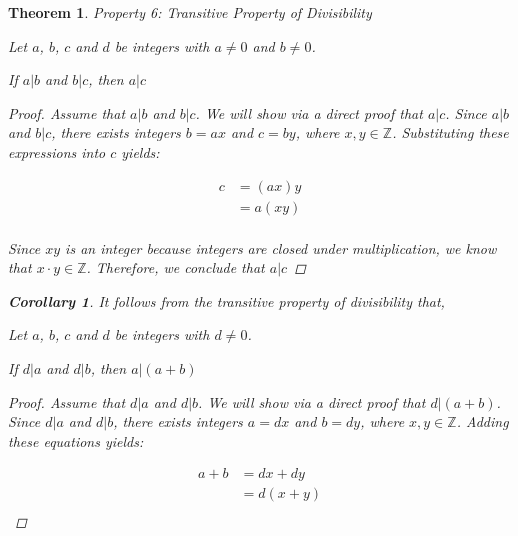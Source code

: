 \documentclass{book}
\newtheorem{theorem}{Theorem}[section]
\newtheorem{corollary}{Corollary}[theorem]
\theoremstyle{definition}
\theoremstyle{remark}
\newcommand{\bb}[1]{\mathbb{#1}}
\newcommand{\m}{\cdot}
\begin{document}
\newpage
\begin{theorem}
Property 6: Transitive Property of Divisibility \\ 
    \begin{tcolorbox}
        Let $a$, $b$, $c$ and $d$ be integers with $a \neq 0$ and $b \neq 0$. 
        \begin{center}
            If $a | b$ and $b | c$, then $a | c$
        \end{center}
    \end{tcolorbox}

    \begin{proof}
        Assume that $a | b$ and $b | c$. We will show via a direct proof that $a | c$. Since $a | b$ and $b | c$, there exists integers $b = ax$ and $c = by$, where $x, y \in \bb{Z}$. Substituting these expressions into $c$ yields:

            \begin{align*}	
            	c & = (ax)y \\
            	    & = a(xy) \\
            \end{align*}

        Since $xy$ is an integer because integers are closed under multiplication, we know that $x \m y \in \bb{Z}$. Therefore, we conclude that $a | c$ 
    \end{proof}

\bigskip
\begin{corollary}
It follows from the transitive property of divisibility that, 
    \begin{tcolorbox}
        Let $a$, $b$, $c$ and $d$ be integers with $d \neq 0$. 
        \begin{center}
            If $d | a$ and $d | b$, then $a | (a + b)$
        \end{center}
    \end{tcolorbox}

    \begin{proof}
        Assume that $d | a$ and $d | b$. We will show via a direct proof that $d | (a + b)$. Since $d | a$ and $d | b$, there exists integers $a = dx$ and $b = dy$, where $x, y \in \bb{Z}$. Adding these equations yields:

            \begin{align*}	
            	a + b & = dx + dy \\
            	    & = d(x + y) \\
            \end{align*}


\end{proof}
\end{corollary}
\end{theorem}
\end{document}
